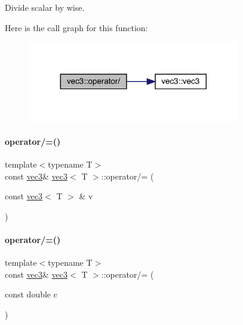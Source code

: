Divide scalar by wise. 

Here is the call graph for this function\+:\nopagebreak
\begin{figure}[H]
\begin{center}
\leavevmode
\includegraphics[width=263pt]{structvec3_aefb92d2dd7d6410991dffc593e9ab874_cgraph}
\end{center}
\end{figure}
\mbox{\label{structvec3_a4e52fc3e08391056d0e6e01a0375c395}} 
\paragraph{\texorpdfstring{operator/=()}{operator/=()}\hspace{0.1cm}{\footnotesize\ttfamily [1/2]}}
{\footnotesize\ttfamily template$<$typename T$>$ \\
const \mbox{\hyperlink{structvec3}{vec3}}\& \mbox{\hyperlink{structvec3}{vec3}}$<$ T $>$\+::operator/= (\begin{DoxyParamCaption}\item[{const \mbox{\hyperlink{structvec3}{vec3}}$<$ T $>$ \&}]{v }\end{DoxyParamCaption})\hspace{0.3cm}{\ttfamily [inline]}}

\mbox{\label{structvec3_ae6d5d20d8b6b4ae286c51b0cb10e5bd0}} 
\paragraph{\texorpdfstring{operator/=()}{operator/=()}\hspace{0.1cm}{\footnotesize\ttfamily [2/2]}}
{\footnotesize\ttfamily template$<$typename T$>$ \\
const \mbox{\hyperlink{structvec3}{vec3}}\& \mbox{\hyperlink{structvec3}{vec3}}$<$ T $>$\+::operator/= (\begin{DoxyParamCaption}\item[{const double}]{c }\end{DoxyParamCaption})\hspace{0.3cm}{\ttfamily [inline]}}

